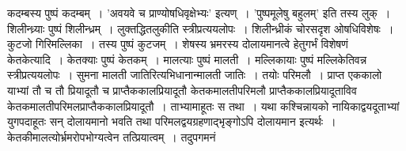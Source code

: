 \documentclass[11pt, openany]{book}
\begin{document}
 कदम्बस्य पुष्पं कदम्बम्~। {\qt 'अवयवे च प्राण्योषधिवृक्षेभ्यः'} इत्यण्~। {\qt 'पुष्पमूलेषु बहुलम्'} इति तस्य लुक्~। शिलीन्ध्र्याः पुष्पं शिलीन्ध्रम्~।
लुक्तद्धितलुकीति
\newpage
\noindent स्त्रीप्रत्ययलोपः~। शिलीन्ध्रीकं चोरसदृश ओषधिविशेषः~। कुटजो गिरिमल्लिका~। तस्य पुष्पं कुटजम्~। शेषस्य भ्रमरस्य दोलायमानत्वे हेतुगर्भं विशेषणं
केतकेत्यादि~। केतक्याः पुष्पं केतकम्~। मालत्याः पुष्पं मालती~। मल्लिकायाः पुष्पं
मल्लिकेतिवन्न स्त्रीप्रत्ययलोपः~। सुमना मालती जातिरित्यभिधानान्मालती जातिः~। तयोः परिमलौ~। प्राप्त एककालो याभ्यां तौ च तौ प्रियादूतौ च प्राप्तैककालप्रियादूतौ
केतकमालतीपरिमलौ प्राप्तैककालप्रियादूताविव केतकमालतीपरिमलप्राप्तैककालप्रियादूतौ~। 
ताभ्यामाहूतः स तथा~। यथा कश्चिन्नायको नायिकाद्वयदूताभ्यां युगपदाहूतः
सन् दोलायमानो भवति तथा परिमलद्वयग्रहणाद्भृङ्गोऽपि दोलायमान इत्यर्थः~।
केतकीमालत्योर्भ्रमरोपभोग्यत्वेन तत्प्रियात्वम्~। तदुपगमनं
\end{document}
